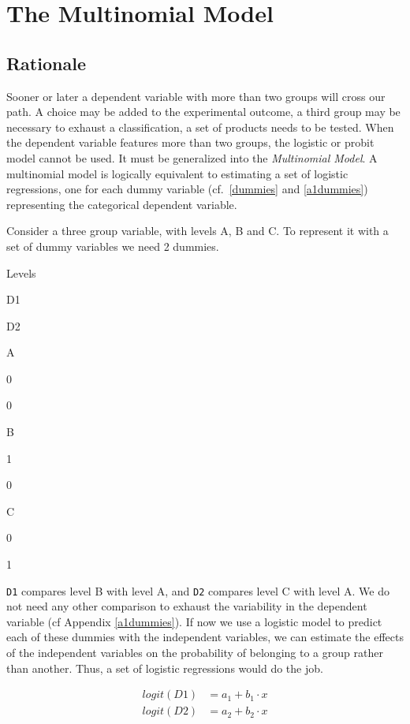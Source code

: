 \documentclass[
]{book}
\begin{document}
\hypertarget{multinomial}{%
\section{The Multinomial Model}\label{multinomial}}

\hypertarget{rationale}{%
\subsection{Rationale}\label{rationale}}

Sooner or later a dependent variable with more than two groups will cross our path. A choice may be added to the experimental outcome, a third group may be necessary to exhaust a classification, a set of products needs to be tested. When the dependent variable features more than two groups, the logistic or probit model cannot be used. It must be generalized into the \emph{Multinomial Model}. A multinomial model is logically equivalent to estimating a set of logistic regressions, one for each dummy variable (cf.~\ref{dummies} and \ref{a1dummies}) representing the categorical dependent variable.

Consider a three group variable, with levels A, B and C. To represent it with a set of dummy variables we need 2 dummies.

Levels

D1

D2

A

0

0

B

1

0

C

0

1

\texttt{D1} compares level B with level A, and \texttt{D2} compares level C with level A. We do not need any other comparison to exhaust the variability in the dependent variable (cf Appendix \ref{a1dummies}). If now we use a logistic model to predict each of these dummies with the independent variables, we can estimate the effects of the independent variables on the probability of belonging to a group rather than another. Thus, a set of logistic regressions would do the job.

\begin{align*}
 logit(D1)  &= a_1 + b_1 \cdot x   \\
 logit(D2)  &= a_2 + b_2 \cdot x   \\
\end{align*}
\end{document}
